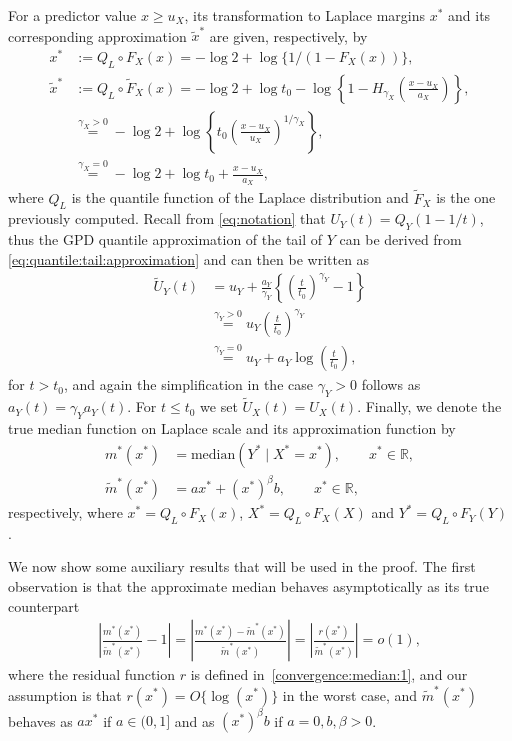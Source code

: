 \documentclass{statsoc}
\theoremstyle{break}
\newcommand{\beam}{\begin{eqnarray}}
\newcommand{\eeam}{\end{eqnarray}\noindent}
\begin{document}
For a predictor value $x \geq u_X$, its transformation to Laplace margins $x^*$ and its corresponding approximation $\tilde x^*$ are given, respectively, by
\begin{align}\label{eq:trans:scale}
	x^* &:= Q_L \circ F_X(x) = -\log 2 + \log\{1/(1-F_X(x)) \},  \\
	\tilde x^* &:= Q_L \circ \tilde F_X(x) = -\log 2 + \log t_0 - \log \left\{ 1 - H_{\gamma_X}\left(\frac{x - u_X}{a_X}\right) \right\}, \nonumber \\
	&  \stackrel{\gamma_X > 0}{=} -\log 2 + \log\left\{ t_0 \left(\frac{x-u_X}{u_X}\right)^{1/\gamma_X}\right\}, \nonumber \\
	& \stackrel{\gamma_X = 0}{=} -\log 2 + \log t_0 + \frac{x - u_X}{a_X}, \nonumber
\end{align}
where $Q_L$ is the quantile function of the Laplace distribution and $\tilde F_X$ is the one previously computed.
Recall from \eqref{eq:notation} that  $U_Y(t) = Q_Y(1-1/t)$, thus  the GPD quantile approximation of the tail of $Y$ can be derived from \eqref{eq:quantile:tail:approximation} and can then be written as 
\begin{align}\label{eq:approx:U}
	\tilde U_Y(t) &= u_Y + \frac{a_Y}{\gamma_Y} \left\{ \left(\frac{t}{t_0}\right)^{\gamma_Y} - 1\right\} \\
	&\stackrel{\gamma_Y > 0}{=} u_Y \left(\frac{t}{t_0}\right)^{\gamma_Y} \nonumber \\
	& \stackrel{\gamma_Y = 0}{=} u_Y + a_Y \log\left(\frac{t}{t_0}\right) \nonumber ,
\end{align}
for $t > t_0$, and  again the simplification in the case $\gamma_Y > 0$ follows as $a_Y(t) = \gamma_Y a_Y(t)$. For  $ t \leq t_0$ we set $\tilde U_X(t) = U_X(t)$.
Finally, we denote the true median function on Laplace scale and its approximation function by
\begin{align*}
	m^*(x^*) &= \text{median}( Y^*  \mid X^* = x^*), \qquad x^* \in \mathbb R,\\
	\tilde m^*(x^*) &= a x^* + (x^*)^\beta b, \qquad x^* \in\mathbb R,
\end{align*}
respectively,
where $x^* = Q_L \circ F_X(x)$, $X^* = Q_L\circ F_X(X)$ and $Y^* = Q_L\circ F_Y(Y)$. 


We now show some auxiliary results that will be used in the proof.
The first observation is that the approximate median behaves asymptotically as its true counterpart
	\beam\label{eq:m:to:infinity} 
	\left| \frac{m^*(x^*)}{ \tilde m^*(x^*)}  - 1 \right|   =  \left|  \frac{m^*(x^*) - \tilde m^*(x^*)}{\tilde m^*(x^*)} \right|  = \left| \frac{r(x^*)}{\tilde m^*(x^*)} \right| = o(1),
	\eeam 
where the residual function $r$ is defined in~\eqref{convergence:median:1}, and our assumption is that $r(x^*) = O\{\log(x^*)\}$ in the worst case, and $\tilde m^*(x^*)$ behaves as $a x^*$ if $a\in(0,1]$ and as $(x^*)^\beta b$ if $ a = 0, b, \beta > 0$.
\end{document}
